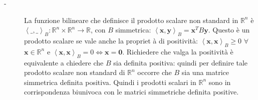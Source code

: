 \documentclass{article}
\begin{document}
\begin{description}
\item[-] La funzione bilineare che definisce il prodotto scalare non
standard in $%
\mathbb{R}
^{n}$ \`{e} $\left\langle \_,\_\right\rangle _{B}:%
\mathbb{R}
^{n}\times 
\mathbb{R}
^{n}\rightarrow 
\mathbb{R}
$, con $B$ simmetrica: $\left\langle \mathbf{x,y}\right\rangle _{B}=\mathbf{x%
}^{T}B\mathbf{y}$. Questo \`{e} un prodotto scalare se vale anche la propriet%
\`{a} di positivit\`{a}: $\left\langle \mathbf{x,x}\right\rangle _{B}\geq 0$ 
$\forall $ $\mathbf{x}\in 
\mathbb{R}
^{n}$ e $\left\langle \mathbf{x,x}\right\rangle _{B}=0\Longleftrightarrow 
\mathbf{x=0}$. Richiedere che valga la positivit\`{a} \`{e} equivalente a
chiedere che $B$ sia definita positiva: quindi per definire tale prodotto
scalare non standard di $%
\mathbb{R}
^{n}$ occorre che $B$ sia una matrice simmetrica definita positiva. Quindi i
prodotti scalari in $%
\mathbb{R}
^{n}$ sono in corrispondenza biunivoca con le matrici simmetriche definita
positive.
\end{description}
\end{document}
